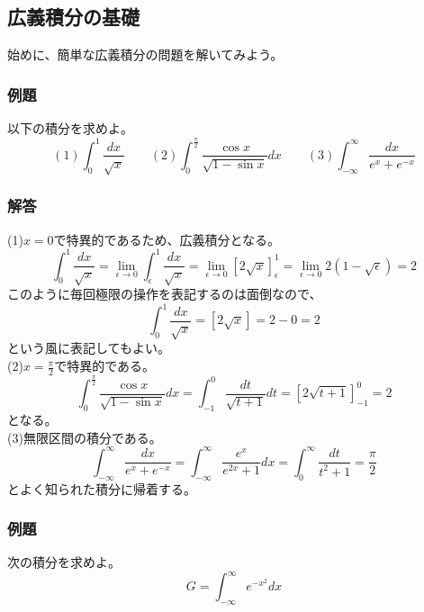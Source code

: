 \documentclass[a4j,dvipdfmx]{jsarticle}
\begin{document}
\subsection{広義積分の基礎}
始めに、簡単な広義積分の問題を解いてみよう。
\subsubsection*{例題}
以下の積分を求めよ。
\begin{equation*}
    (1)\int_0^1\frac{dx}{\sqrt{x}}\qquad(2)\int_0^\frac{\pi}{2} \frac{\cos x}{\sqrt{1-\sin x}}dx\qquad (3)\int_{-\infty}^\infty \frac{dx}{e^x+e^{-x}}
\end{equation*}
\subsubsection*{解答}
(1)$x=0$で特異的であるため、広義積分となる。
\begin{equation*}
    \int_0^1\frac{dx}{\sqrt{x}}=\lim_{\epsilon\to 0}\int_{\epsilon}^1\frac{dx}{\sqrt{x}}=\lim_{\epsilon\to 0}\left[2\sqrt{x}\right]_\epsilon^1=\lim_{\epsilon\to 0}2(1-\sqrt{\epsilon})=2
\end{equation*}
このように毎回極限の操作を表記するのは面倒なので、
\begin{equation*}
    \int_0^1\frac{dx}{\sqrt{x}}=\left[2\sqrt{x}\right]=2-0=2
\end{equation*}
という風に表記してもよい。\\

(2)$x=\frac{\pi}{2}$で特異的である。
\begin{equation*}
    \int_0^\frac{\pi}{2}\frac{\cos x}{\sqrt{1-\sin x}}dx=\int_{-1}^0 \frac{dt}{\sqrt{t+1}}dt=\left[2\sqrt{t+1}\right]_{-1}^0=2
\end{equation*}
となる。\\

(3)無限区間の積分である。
\begin{equation*}
    \int_{-\infty}^\infty \frac{dx}{e^x+e^{-x}}=\int_{-\infty}^\infty \frac{e^x}{e^{2x}+1}dx=\int_0^\infty \frac{dt}{t^2+1}=\frac{\pi}{2}
\end{equation*}
とよく知られた積分に帰着する。
\newpage
\subsubsection*{例題}
次の積分を求めよ。
\begin{equation*}
    G=\int_{-\infty}^{\infty}e^{-x^2}dx
\end{equation*}
\end{document}
